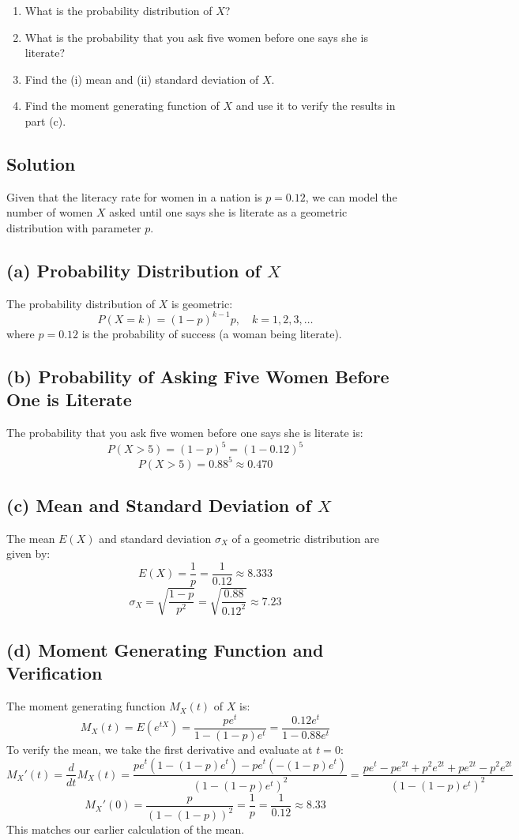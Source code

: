 \documentclass{article}
\begin{document}
\begin{enumerate}
    \item What is the probability distribution of \(X\)?
    \item What is the probability that you ask five women before one says she is literate?
    \item Find the (i) mean and (ii) standard deviation of \(X\).
    \item Find the moment generating function of \(X\) and use it to verify the results in part (c).
\end{enumerate}
\subsection*{Solution}
Given that the literacy rate for women in a nation is \( p = 0.12 \), we can model the number of women \( X \) asked until one says she is literate as a geometric distribution with parameter \( p \).

\subsection*{(a) Probability Distribution of \( X \)}
The probability distribution of \( X \) is geometric:
\[
P(X = k) = (1-p)^{k-1} p, \quad k = 1, 2, 3, \ldots
\]
where \( p = 0.12 \) is the probability of success (a woman being literate).

\subsection*{(b) Probability of Asking Five Women Before One is Literate}
The probability that you ask five women before one says she is literate is:
\[
P(X > 5) = (1-p)^5 = (1-0.12)^5
\]
\[
P(X > 5) = 0.88^5 \approx 0.470
\]

\subsection*{(c) Mean and Standard Deviation of \( X \)}
The mean \( E(X) \) and standard deviation \( \sigma_X \) of a geometric distribution are given by:
\[
E(X) = \frac{1}{p} = \frac{1}{0.12} \approx 8.333
\]
\[
\sigma_X = \sqrt{\frac{1-p}{p^2}} = \sqrt{\frac{0.88}{0.12^2}} \approx 7.23
\]

\subsection*{(d) Moment Generating Function and Verification}
The moment generating function \( M_X(t) \) of \( X \) is:
\[
M_X(t) = E(e^{tX}) = \frac{pe^t}{1-(1-p)e^t} = \frac{0.12e^t}{1-0.88e^t}
\]
To verify the mean, we take the first derivative and evaluate at \( t = 0 \):
\[
M_X'(t) = \frac{d}{dt} M_X(t) = \frac{pe^t(1-(1-p)e^t) - pe^t(-(1-p)e^t)}{(1-(1-p)e^t)^2} = \frac{pe^t - pe^{2t}  +p^2e^{2t} + pe^{2t} -p^2e^{2t}}{(1-(1-p)e^t)^2}
\]
\[
M_X'(0) = \frac{p}{(1-(1-p))^2} = \frac{1}{p} = \frac{1}{0.12} \approx 8.33
\]
This matches our earlier calculation of the mean.
\end{document}
